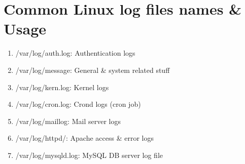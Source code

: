 \documentclass[12pt, a4paper]{report}
\begin{document}
\section{Common Linux log files names \& Usage}
\begin{enumerate}
\item /var/log/auth.log: Authentication logs
\item /var/log/message: General \& system related stuff
\item /var/log/kern.log: Kernel logs
\item /var/log/cron.log: Crond logs (cron job)
\item /var/log/maillog: Mail server logs
\item /var/log/httpd/: Apache access \& error logs
\item /var/log/mysqld.log: MySQL DB server log file
\end{enumerate}
\end{document}
